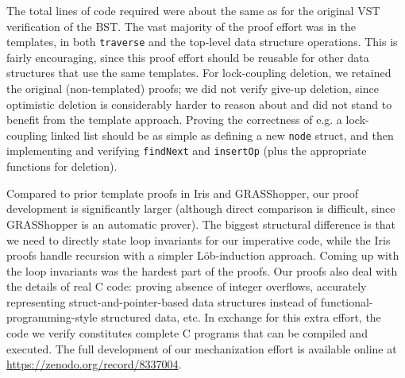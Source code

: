 \documentclass[sigplan,10pt, screen]{acmart}
\begin{document}
The total lines of code required were about the same as for the original VST verification of the BST. The vast majority of the proof effort was in the templates, in both \lstinline{traverse} and the top-level data structure operations. This is fairly encouraging, since this proof effort should be reusable for other data structures that use the same templates. For lock-coupling deletion, we retained the original (non-templated) proofs; we did not verify give-up deletion, since optimistic deletion is considerably harder to reason about and did not stand to benefit from the template approach.
Proving the correctness of e.g. a lock-coupling linked list should be as simple as defining a new \lstinline{node} struct, and then implementing and verifying \lstinline{findNext} and \lstinline{insertOp} (plus the appropriate functions for deletion).


Compared to prior template proofs in Iris and GRASShopper, our proof development is significantly larger (although direct comparison is difficult, since GRASShopper is an automatic prover). The biggest structural difference is that we need to directly state loop invariants for our imperative code, while the Iris proofs handle recursion with a simpler Löb-induction approach. Coming up with the loop invariants was the hardest part of the proofs. Our proofs also deal with the details of real C code: proving absence of integer overflows, accurately representing struct-and-pointer-based data structures instead of functional-programming-style structured data, etc. In exchange for this extra effort, the code we verify constitutes complete C programs that can be compiled and executed.
The full development of our mechanization effort is available online at \href{https://zenodo.org/record/8337004}{https://zenodo.org/record/8337004}.
\end{document}
